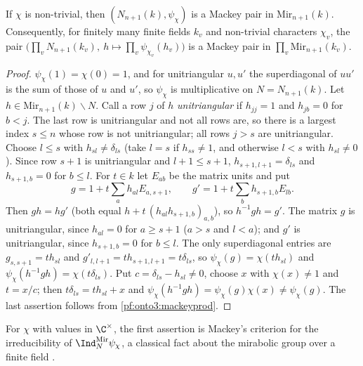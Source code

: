 \begin{lemma}\label{pf:onto3:mirabolic}
If $\chi$ is non-trivial, then $(N_{n+1}(k),\psi_\chi)$ is a Mackey pair in $\mathrm{Mir}_{n+1}(k)$. Consequently,
for finitely many finite fields $k_v$ and non-trivial characters $\chi_v$, the pair
$\bigl(\prod_vN_{n+1}(k_v),\ h\mapsto\prod_v\psi_{\chi_v}(h_v)\bigr)$ is a Mackey pair in
$\prod_v\mathrm{Mir}_{n+1}(k_v)$.
\end{lemma}

\begin{proof}
$\psi_\chi(1)=\chi(0)=1$, and for unitriangular $u,u'$ the superdiagonal of $uu'$ is the sum of those of $u$ and
$u'$, so $\psi_\chi$ is multiplicative on $N=N_{n+1}(k)$. Let $h\in\mathrm{Mir}_{n+1}(k)\smallsetminus N$. Call a row
$j$ of $h$ \emph{unitriangular} if $h_{jj}=1$ and $h_{jb}=0$ for $b<j$. The last row is unitriangular and not all
rows are, so there is a largest index $s\le n$ whose row is not unitriangular; all rows $j>s$ are unitriangular.
Choose $l\le s$ with $h_{sl}\ne\delta_{ls}$ (take $l=s$ if $h_{ss}\ne1$, and otherwise $l<s$ with $h_{sl}\ne0$).
Since row $s+1$ is unitriangular and $l+1\le s+1$, $h_{s+1,l+1}=\delta_{ls}$ and $h_{s+1,b}=0$ for $b\le l$.
For $t\in k$ let $E_{ab}$ be the matrix units and put
\[
g=1+t\sum_ah_{al}E_{a,s+1},\qquad g'=1+t\sum_bh_{s+1,b}E_{lb}.
\]
Then $gh=hg'$ (both equal $h+t\,(h_{al}h_{s+1,b})_{a,b}$), so $h^{-1}gh=g'$. The matrix $g$ is unitriangular,
since $h_{al}=0$ for $a\ge s+1$ ($a>s$ and $l<a$); and $g'$ is unitriangular, since $h_{s+1,b}=0$ for $b\le l$.
The only superdiagonal entries are $g_{s,s+1}=th_{sl}$ and $g'_{l,l+1}=th_{s+1,l+1}=t\delta_{ls}$, so
$\psi_\chi(g)=\chi(th_{sl})$ and $\psi_\chi(h^{-1}gh)=\chi(t\delta_{ls})$. Put $c=\delta_{ls}-h_{sl}\ne0$, choose $x$
with $\chi(x)\ne1$ and $t=x/c$; then $t\delta_{ls}=th_{sl}+x$ and $\psi_\chi(h^{-1}gh)=\psi_\chi(g)\chi(x)\ne
\psi_\chi(g)$. The last assertion follows from \cref{pf:onto3:mackeyprod}.
\end{proof}

\begin{remark}
For $\chi$ with values in $\C^\times$, the first assertion is Mackey's criterion for the irreducibility of
$\Ind_{N}^{\mathrm{Mir}}\psi_\chi$, a classical fact about the mirabolic group over a finite field
\cite{GelfandKazhdan1975,BernsteinZelevinsky1976}.
\end{remark}

